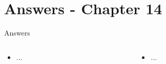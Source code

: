 \documentclass{beamer}
\begin{document}
\section{Answers - Chapter 14}

\begin{frame}{Answers}
\small
\begin{columns}[T]
\begin{column}{0.5\textwidth}
\begin{itemize}
\item ...
\end{itemize}
\end{column}
\begin{column}{0.5\textwidth}
\begin{itemize}
\item ...
\end{itemize}
\end{column}
\end{columns}
\end{frame}
\end{document}

